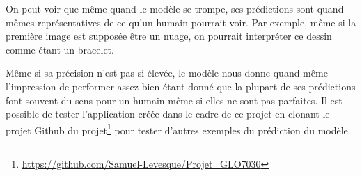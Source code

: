 On peut voir que même quand le modèle se trompe, ses prédictions sont quand mêmes représentatives de ce qu'un humain pourrait voir.
Par exemple, même si la première image est supposée être un nuage, on pourrait interpréter ce dessin comme étant un bracelet.


Même si sa précision n'est pas si élevée, le modèle nous donne quand même l'impression de performer assez bien étant donné que la plupart de ses prédictions font souvent du sens pour un humain même si elles ne sont pas parfaites.
Il est possible de tester l'application créée dans le cadre de ce projet en clonant le projet Github du projet\footnote{\url{https://github.com/Samuel-Levesque/Projet_GLO7030}} pour tester d'autres exemples du prédiction du modèle.

